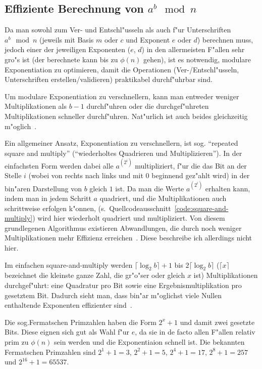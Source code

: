 \documentclass[12pt]{article}
\begin{document}
\subsection{Effiziente Berechnung von $a^b \mod n$}
\label{subsec:practical:exp}

Da man sowohl zum Ver- und Entschl"usseln als auch f"ur Unterschriften $a^b \mod n$
(jeweils mit Basis $m$ oder $c$ und Exponent $e$ oder $d$) berechnen muss,
jedoch einer der jeweiligen Exponenten ($e$, $d$) in den allermeisten F"allen
sehr gro"s ist (der berechnete kann bis zu $\phi(n)$ gehen),
ist es notwendig, modulare Exponentiation zu optimieren,
damit die Operationen (Ver-/Entschl"usseln, Unterschriften erstellen/validieren)
praktikabel durch\-f"uhr\-bar sind.

Um modulare Exponentiation zu verschnellern, kann man entweder weniger Multiplikationen
als $b-1$ durchf"uhren oder die durchgef"uhreten Multiplikationen schneller durchf"uhren.
Nat"urlich ist auch beides gleichzeitig m"oglich~\cite{hac}.

Ein allgemeiner Ansatz, Exponentiation zu verschnellern, ist sog.\@
"`repeated square and multiply"' ("`wiederholtes Quadrieren und Multiplizieren"').
In der einfachsten Form werden dabei alle $a^{(2^i)}$ multipliziert,
f"ur die das Bit an der Stelle $i$ (wobei von rechts nach links und mit 0 beginnend gez"ahlt wird)
in der bin"aren Darstellung von $b$ gleich $1$ ist.
Da man die Werte $a^{(2^i)}$ erhalten kann, indem man in jedem Schritt $a$ quadriert,
und die Multiplikationen auch schrittweise erfolgen k"onnen, (s.~Quell\-code\-aus\-schnitt~\ref{code:square-and-multiply})
wird hier wiederholt quadriert und multipliziert.
Von diesem grundlegenen Algorithmus existieren Abwandlungen,
die durch noch weniger Multiplikationen mehr Effizienz erreichen~\cite{hac}.
Diese beschreibe ich allerdings nicht hier.

Im einfachen square-and-multiply werden $\lceil \log_2 b \rceil + 1$ bis $2 \lceil \log_2 b \rceil$
($\lceil x \rceil$ bezeichnet die kleinste ganze Zahl, die gr"o"ser oder gleich $x$ ist)
Multiplikationen durchgef"uhrt: eine Quadratur pro Bit sowie eine Ergebnismultiplikation pro ge\-setz\-tem Bit.
Dadurch sieht man, dass bin"ar m"oglichst viele Nullen enthaltende Exponenten effizienter sind~\cite{hac}.

Die sog.\@ Fermatschen Primzahlen haben die Form $2^x + 1$ und damit zwei gesetzte Bits.
Diese eignen sich gut als Wahl f"ur $e$, da sie in de facto allen F"allen relativ prim zu
$\phi(n)$ sein werden und die Exponentiaion schnell ist.
Die bekannten Fermatschen Primzahlen sind $2^1 + 1 = 3$, $2^2+1 = 5$, $2^4 + 1 = 17$, $2^8+1 = 257$ und $2^{16} + 1 = 65537$.
\end{document}
